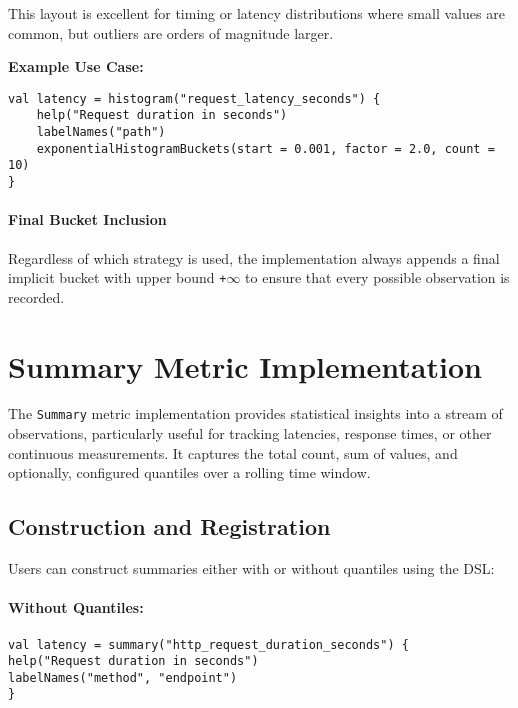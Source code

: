 This layout is excellent for timing or latency distributions where small values are common, but outliers are orders of magnitude larger.

\vspace{0.5em}
\noindent
\textbf{Example Use Case:}
\begin{verbatim}
val latency = histogram("request_latency_seconds") {
    help("Request duration in seconds")
    labelNames("path")
    exponentialHistogramBuckets(start = 0.001, factor = 2.0, count = 10)
}
\end{verbatim}

\paragraph{Final Bucket Inclusion}

Regardless of which strategy is used, the implementation always appends a final implicit bucket with upper bound \texttt{+\(\infty\)} to ensure that every possible observation is recorded.






\section{Summary Metric Implementation}

The \texttt{Summary} metric implementation provides statistical insights into a stream of observations, particularly useful for tracking latencies, response times, or other continuous measurements. It captures the total count, sum of values, and optionally, configured quantiles over a rolling time window.

\subsection{Construction and Registration}

Users can construct summaries either with or without quantiles using the DSL:

\paragraph{Without Quantiles:}
\begin{verbatim}
val latency = summary("http_request_duration_seconds") {
help("Request duration in seconds")
labelNames("method", "endpoint")
}
\end{verbatim}

